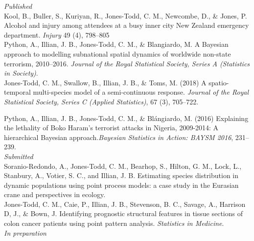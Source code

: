 \documentclass[10pt,a4paper]{moderncv}
\begin{document}
  \textit{\small{Published}}\\

\vspace{-3pt}
Kool, B., Buller, S., Kuriyan, R., Jones-Todd, C. M., Newcombe, D., \& Jones, P. Alcohol and injury among attendees at a busy inner city New Zealand emergency department. \textit{Injury} 49 (4), 798--805\\


\vspace{-3pt}
Python, A.,  Illian, J. B., Jones-Todd, C. M., \& Blangiardo, M. A Bayesian approach to modelling subnational spatial dynamics of worldwide non-state terrorism, 2010--2016. \textit{Journal of the Royal Statistical Society, Series  A (Statistics in Society)}.\\

  Jones-Todd, C. M., Swallow, B., Illian, J. B., \& Toms, M. (2018) A spatio-temporal multi-species model of a semi-continuous response. \textit{Journal of the Royal Statistical Society, Series C (Applied Statistics)}, 67 (3), 705--722.\\
\vspace{5pt}

\vspace{-3pt}
Python, A.,  Illian, J. B., Jones-Todd, C. M., \& Bl\'{a}ngiardo, M. (2016) Explaining the lethality of Boko Haram’s terrorist attacks in Nigeria, 2009-2014: A hierarchical Bayesian approach.\textit{Bayesian Statistics in Action: BAYSM 2016}, 231--239.\\


\textit{\small{Submitted}}\\

\vspace{-3pt}
Soranio-Redondo, A., Jones-Todd, C. M., Bearhop, S., Hilton, G. M., Lock, L., Stanbury, A., Votier, S. C., and Illian, J. B. Estimating species distribution in dynamic populations using point process models: a case study in the Eurasian crane and perspectives in ecology. \\

\vspace{-3pt}
Jones-Todd, C. M., Caie, P., Illian, J. B., Stevenson, B. C., Savage, A., Harrison D, J., \& Bown, J. Identifying prognostic structural features in tissue sections of colon cancer patients using point pattern analysis. \textit{Statistics in Medicine}.\\


\textit{\small{In preparation}}\\
\end{document}
